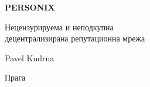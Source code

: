 \thispagestyle{empty}
\begin{center}
  {\sffamily\bfseries\fontsize{34}{40}\selectfont PERSONIX\par}
  \vspace{2.2em}
  {\rmfamily\large Нецензурируема и неподкупна\\[0.25em]
   децентрализирана репутационна мрежа\par}
\end{center}
\begin{center}
  {\rmfamily\Large Pavel Kudrna\par}
  \vspace{0.45em}
  {\rmfamily\small Прага\quad\textbullet{}\par}
\end{center}
\clearpage
